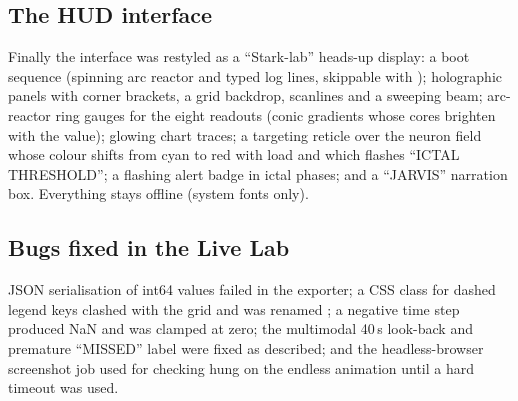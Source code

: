 \subsection{The HUD interface}

Finally the interface was restyled as a ``Stark-lab'' heads-up display: a boot sequence (spinning arc reactor and typed log lines, skippable with ); holographic panels with corner brackets, a grid backdrop, scanlines and a sweeping beam; arc-reactor ring gauges for the eight readouts (conic gradients whose cores brighten with the value); glowing chart traces; a targeting reticle over the neuron field whose colour shifts from cyan to red with \Kp{} load and which flashes ``ICTAL THRESHOLD''; a flashing alert badge in ictal phases; and a ``JARVIS'' narration box. Everything stays offline (system fonts only).

\subsection{Bugs fixed in the Live Lab}

JSON serialisation of int64 values failed in the exporter; a CSS class  for dashed legend keys clashed with the  grid and was renamed ; a negative  time step produced NaN and was clamped at zero; the multimodal 40\,s look-back and premature ``MISSED'' label were fixed as described; and the headless-browser screenshot job used for checking hung on the endless animation until a hard timeout was used.
